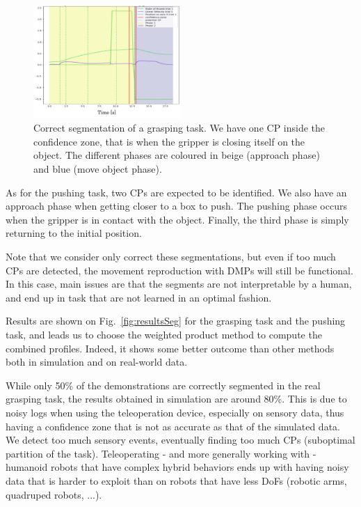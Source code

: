\documentclass[a4paper, 10pt, conference]{ieeeconf}
\begin{document}
\begin{figure}[t]
  \centering
  \includegraphics[width=0.5\textwidth]{img/resolSeg.pdf}
  \caption{Correct segmentation of a grasping task. We have one CP inside the confidence zone, that is when the gripper is closing itself on the object. The different phases are coloured in beige (approach phase) and blue (move object phase).}
  \label{fig:coloredseg}
\end{figure}

As for the pushing task, two CPs are expected to be identified. We also have an approach phase when getting closer to a box to push. The pushing phase occurs when the gripper is in contact with the object. Finally, the third phase is simply returning to the initial position.

Note that we consider only correct these segmentations, but even if too much CPs are detected, the movement reproduction with DMPs will still be functional. In this case, main issues are that the segments are not interpretable by a human, and end up in task that are not learned in an optimal fashion.


Results are shown on Fig.~\ref{fig:resultsSeg} for the grasping task and the pushing task, and leads us to choose the weighted product method to compute the combined profiles. Indeed, it shows some better outcome than other methods both in simulation and on real-world data. 

While only 50\% of the demonstrations are correctly segmented in the real grasping task, the results obtained in simulation are around 80\%. This is due to noisy logs when using the teleoperation device, especially on sensory data, thus having a confidence zone that is not as accurate as that of the simulated data. We detect too much sensory events, eventually finding too much CPs (suboptimal partition of the task). Teleoperating - and more generally working with - humanoid robots that have complex hybrid behaviors ends up with having noisy data that is harder to exploit than on robots that have less DoFs (robotic arms, quadruped robots, ...).
\end{document}

